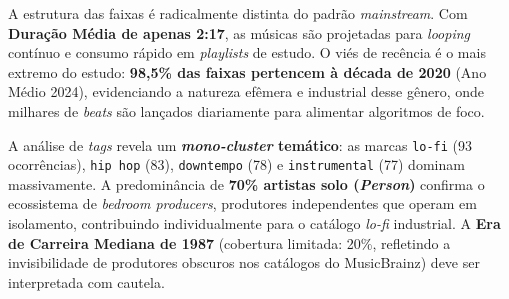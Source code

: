 \documentclass[12pt, %
openright,
oneside, %
a4paper,    %
english,   %
brazil]{facom-ufu-abntex2}
\begin{document}
A estrutura das faixas é radicalmente distinta do padrão \emph{mainstream}. Com
\textbf{Duração Média de apenas 2:17}, as músicas são projetadas para
\emph{looping} contínuo e consumo rápido em \emph{playlists} de estudo. O viés de
recência é o mais extremo do estudo: \textbf{98,5\% das faixas pertencem à década
de 2020} (Ano Médio 2024), evidenciando a natureza efêmera e industrial desse
gênero, onde milhares de \emph{beats} são lançados diariamente para alimentar
algoritmos de foco.

A análise de \emph{tags} revela um \textbf{\emph{mono-cluster} temático}: as
marcas \texttt{lo-fi} (93 ocorrências), \texttt{hip hop} (83),
\texttt{downtempo} (78) e \texttt{instrumental} (77) dominam massivamente. A
predominância de \textbf{70\% artistas solo (\emph{Person})} confirma o
ecossistema de \emph{bedroom producers}, produtores independentes que operam
em isolamento, contribuindo individualmente para o catálogo \emph{lo-fi}
industrial. A \textbf{Era de Carreira Mediana de 1987} (cobertura limitada: 20\%,
refletindo a invisibilidade de produtores obscuros nos catálogos do MusicBrainz)
deve ser interpretada com cautela.
\end{document}
